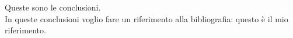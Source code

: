 Queste sono le conclusioni.\\ 
In queste conclusioni voglio fare un riferimento alla \cite{Bortolotti_2012}
bibliografia: questo \`e il mio riferimento.
